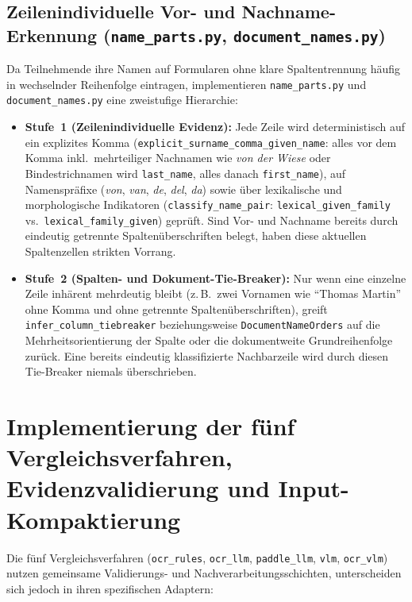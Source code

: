 \subsection{Zeilenindividuelle Vor- und Nachname-Erkennung (\texttt{name\_parts.py}, \texttt{document\_names.py})}
\label{subsec:umsetzung-namen}

Da Teilnehmende ihre Namen auf Formularen ohne klare Spaltentrennung häufig in wechselnder Reihenfolge eintragen, implementieren \texttt{name\_parts.py} und \texttt{document\_names.py} eine zweistufige Hierarchie:
\begin{itemize}
  \item \textbf{Stufe~1 (Zeilenindividuelle Evidenz):} Jede Zeile wird deterministisch auf ein explizites Komma (\texttt{explicit\_surname\_comma\_given\_name}: alles vor dem Komma inkl.\ mehrteiliger Nachnamen wie \emph{von der Wiese} oder Bindestrichnamen wird \texttt{last\_name}, alles danach \texttt{first\_name}), auf Namenspräfixe (\emph{von}, \emph{van}, \emph{de}, \emph{del}, \emph{da}) sowie über lexikalische und morphologische Indikatoren (\texttt{classify\_name\_pair}: \texttt{lexical\_given\_family} vs.\ \texttt{lexical\_family\_given}) geprüft. Sind Vor- und Nachname bereits durch eindeutig getrennte Spaltenüberschriften belegt, haben diese aktuellen Spaltenzellen strikten Vorrang.
  \item \textbf{Stufe~2 (Spalten- und Dokument-Tie-Breaker):} Nur wenn eine einzelne Zeile inhärent mehrdeutig bleibt (z.\,B.\ zwei Vornamen wie \enquote{Thomas Martin} ohne Komma und ohne getrennte Spaltenüberschriften), greift \texttt{infer\_column\_tiebreaker} beziehungsweise \texttt{DocumentNameOrders} auf die Mehrheitsorientierung der Spalte oder die dokumentweite Grundreihenfolge zurück. Eine bereits eindeutig klassifizierte Nachbarzeile wird durch diesen Tie-Breaker niemals überschrieben.
\end{itemize}

\section{Implementierung der fünf Vergleichsverfahren, Evidenzvalidierung und Input-Kompaktierung}
\label{sec:umsetzung-verfahren}

Die fünf Vergleichsverfahren (\texttt{ocr\_rules}, \texttt{ocr\_llm}, \texttt{paddle\_llm}, \texttt{vlm}, \texttt{ocr\_vlm}) nutzen gemeinsame Validierungs- und Nachverarbeitungsschichten, unterscheiden sich jedoch in ihren spezifischen Adaptern:

